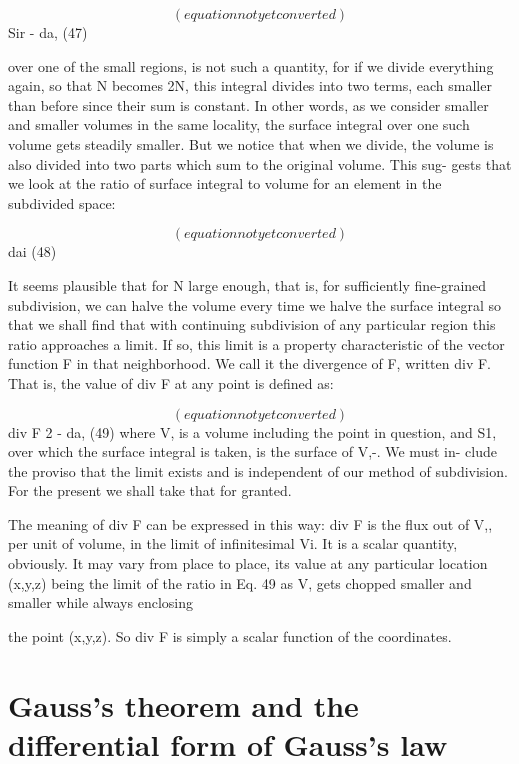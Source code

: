 \begin{equation}
(equation not yet converted)
\end{equation}
Sir - da, (47)

over one of the small regions, is not such a quantity, for if we divide
everything again, so that N becomes 2N, this integral divides into two
terms, each smaller than before since their sum is constant. In other
words, as we consider smaller and smaller volumes in the same
locality, the surface integral over one such volume gets steadily
smaller. But we notice that when we divide, the volume is also
divided into two parts which sum to the original volume. This sug-
gests that we look at the ratio of surface integral to volume for an
element in the subdivided space:

\begin{equation}
(equation not yet converted)
\end{equation}
 dai (48)

It seems plausible that for N large enough, that is, for sufficiently
fine-grained subdivision, we can halve the volume every time we
halve the surface integral so that we shall find that with continuing
subdivision of any particular region this ratio approaches a limit. If
so, this limit is a property characteristic of the vector function F in
that neighborhood. We call it the divergence of F, written div F.
That is, the value of div F at any point is defined as:

\begin{equation}
(equation not yet converted)
\end{equation}
div F 2  - da, (49)
where V, is a volume including the point in question, and S1, over
which the surface integral is taken, is the surface of V,-. We must in-
clude the proviso that the limit exists and is independent of our
method of subdivision. For the present we shall take that for
granted.

The meaning of div F can be expressed in this way: div F is the
flux out of V,, per unit of volume, in the limit of infinitesimal Vi. It
is a scalar quantity, obviously. It may vary from place to place, its
value at any particular location (x,y,z) being the limit of the ratio in
Eq. 49 as V, gets chopped smaller and smaller while always enclosing

the point (x,y,z). So div F is simply a scalar function of the
coordinates.

\section{Gauss's theorem and the differential form of Gauss's law}

